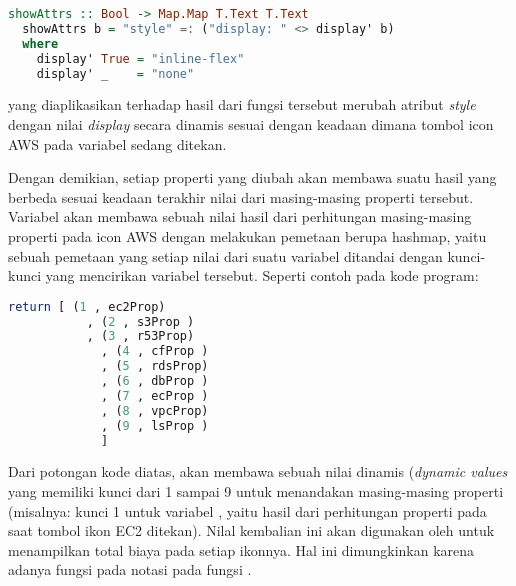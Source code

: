 \documentclass[pi.tex]{subfile}
\begin{document}
  \begin{lstlisting}[language=Haskell]
  showAttrs :: Bool -> Map.Map T.Text T.Text
  showAttrs b = "style" =: ("display: " <> display' b)
  where
    display' True = "inline-flex"
    display' _    = "none"
  \end{lstlisting}
  yang diaplikasikan terhadap hasil dari fungsi  tersebut merubah atribut \emph{style} dengan nilai \emph{display} secara dinamis sesuai dengan keadaan dimana tombol icon AWS pada variabel  sedang ditekan.

  \hspace{10pt}Dengan demikian, setiap properti yang diubah akan membawa suatu hasil yang berbeda sesuai keadaan terakhir nilai dari masing-masing properti tersebut. Variabel  akan membawa sebuah nilai hasil dari perhitungan masing-masing properti pada icon AWS dengan melakukan pemetaan berupa hashmap, yaitu sebuah pemetaan yang setiap nilai dari suatu variabel ditandai dengan kunci-kunci yang mencirikan variabel tersebut. Seperti contoh pada kode program:\\
    \begin{lstlisting}[language=Haskell]
  return [ (1 , ec2Prop)
	       , (2 , s3Prop )
	       , (3 , r53Prop)
		     , (4 , cfProp )
		     , (5 , rdsProp)
		     , (6 , dbProp )
		     , (7 , ecProp )
		     , (8 , vpcProp)
		     , (9 , lsProp )
		     ]
    \end{lstlisting}

   \hspace{10pt} Dari potongan kode diatas,  akan membawa sebuah nilai dinamis (\emph{dynamic values} yang memiliki kunci dari 1 sampai 9 untuk menandakan masing-masing properti (misalnya: kunci 1 untuk variabel , yaitu hasil dari perhitungan properti pada saat tombol ikon EC2 ditekan). Nilal kembalian ini akan digunakan oleh  untuk menampilkan total biaya pada setiap ikonnya. Hal ini dimungkinkan karena adanya fungsi  pada notasi  pada fungsi .
\end{document}

